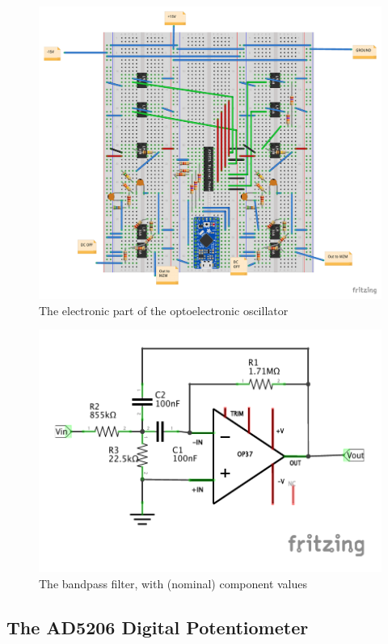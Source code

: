 \documentclass{article}
\begin{document}
    \begin{figure}[]
        \centering
        \includegraphics[width=\textwidth]{figs/bb.pdf}
        \caption{The electronic part of the optoelectronic oscillator}
        \label{circuitdiag}
    \end{figure}

    \begin{figure}[]
        \centering
        \includegraphics[]{figs/bpfilt.pdf}
        \caption{The bandpass filter, with (nominal) component values}
        \label{bpfiltdiag}
    \end{figure}

    \subsection{The AD5206 Digital Potentiometer}
\end{document}
